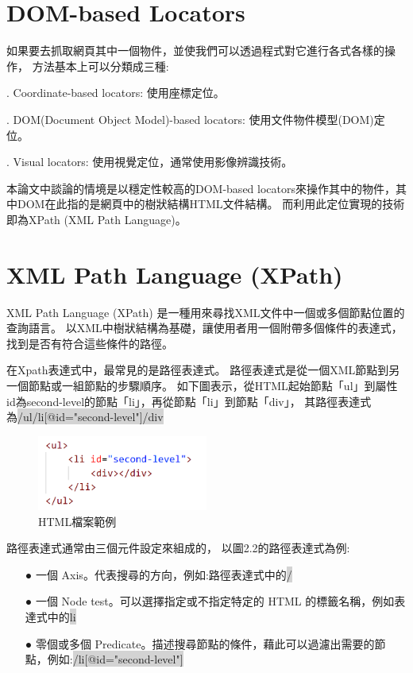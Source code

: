 \section{DOM-based Locators}\label{s2.3}
如果要去抓取網頁其中一個物件，並使我們可以透過程式對它進行各式各樣的操作，
方法基本上可以分類成三種:

. Coordinate-based locators: 使用座標定位。

. DOM(Document Object Model)-based locators: 使用文件物件模型(DOM)定位。

. Visual locators: 使用視覺定位，通常使用影像辨識技術。

\indent
本論文中談論的情境是以穩定性較高的DOM-based locators來操作其中的物件，其中DOM在此指的是網頁中的樹狀結構HTML文件結構。
而利用此定位實現的技術即為XPath (XML Path Language)。


\section{XML Path Language (XPath)}\label{s2.4}
XML Path Language (XPath) 是一種用來尋找XML文件中一個或多個節點位置的查詢語言。
以XML中樹狀結構為基礎，讓使用者用一個附帶多個條件的表達式，找到是否有符合這些條件的路徑。

\indent
在Xpath表達式中，最常見的是路徑表達式。
路徑表達式是從一個XML節點到另一個節點或一組節點的步驟順序。
如下圖表示，從HTML起始節點「ul」到屬性id為second-level的節點「li」，再從節點「li」到節點「div」，
其路徑表達式為\colorbox{lightgray}{/ul/li[@id="second-level"]/div}                                                                                                                                                                                                                                                   

\begin{figure}[H]
    \centering
    \includegraphics[width=0.5\textwidth]{picture/ch2-xpathExample.png}
    \caption{HTML檔案範例}
    \label{f2.2}
\end{figure}

路徑表達式通常由三個元件設定來組成的，
以圖2.2的路徑表達式為例:

\begin{itemize}
\item[●] 一個 Axis。代表搜尋的方向，例如:路徑表達式中的\colorbox{lightgray}{/}
\item[●] 一個 Node test。可以選擇指定或不指定特定的 HTML 的標籤名稱，例如表達式中的\colorbox{lightgray}{li}
\item[●] 零個或多個 Predicate。描述搜尋節點的條件，藉此可以過濾出需要的節點，例如:\colorbox{lightgray}{/li[@id="second-level"]}
\end{itemize}

